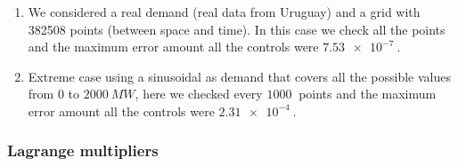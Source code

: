 \documentclass[12pt]{article}
\theoremstyle{definition}
\theoremstyle{remark}
\begin{document}
\begin{enumerate}
\item We considered a real demand (real data from Uruguay) and a grid with 382508 points (between space and time). In this case we check all the points and the maximum error amount all the controls were $\SI{7.53e-7}{}$.
\item Extreme case using a sinusoidal as demand that covers all the possible values from 0 to $\SI{2000}{MW}$, here we checked every $\SI{1000}{}$ points and the maximum error amount all the controls were $\SI{2.31e-4}{}$.
\end{enumerate}

\subsubsection{Lagrange multipliers}
\end{document}

